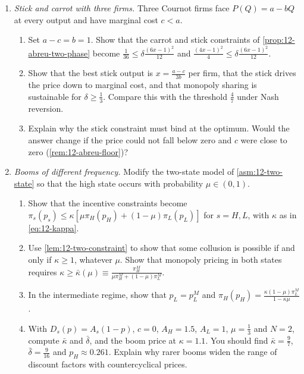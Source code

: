 \begin{enumerate}[label=\arabic*., leftmargin=*, itemsep=6pt]
\item \textit{Stick and carrot with three firms.} Three Cournot firms face $P(Q) = a - bQ$ at every output and have
marginal cost $c < a$.
\begin{enumerate}[label=(\alph*)]
  \item Set $a - c = b = 1$. Show that the carrot and stick constraints of \cref{prop:12-abreu-two-phase} become
  $\frac{1}{36} \le \delta\frac{(6x - 1)^2}{12}$ and $\frac{(4x - 1)^2}{4} \le \delta\frac{(6x - 1)^2}{12}$.
  \item Show that the best stick output is $x = \frac{a - c}{3b}$ per firm, that the stick drives the price down to
  marginal cost, and that monopoly sharing is sustainable for $\delta \ge \frac{1}{3}$. Compare this with the
  threshold $\frac{4}{7}$ under Nash reversion.
  \item Explain why the stick constraint must bind at the optimum. Would the answer change if the price could not
  fall below zero and $c$ were close to zero (\cref{rem:12-abreu-floor})?
\end{enumerate}

\item \textit{Booms of different frequency.} Modify the two-state model of \cref{asm:12-two-state} so that the high
state occurs with probability $\mu \in (0, 1)$.
\begin{enumerate}[label=(\alph*)]
  \item Show that the incentive constraints become $\pi_s(p_s) \le \kappa[\mu\pi_H(p_H) + (1 - \mu)\pi_L(p_L)]$ for
  $s = H, L$, with $\kappa$ as in \eqref{eq:12-kappa}.
  \item Use \cref{lem:12-two-constraint} to show that some collusion is possible if and only if $\kappa \ge 1$,
  whatever $\mu$. Show that monopoly pricing in both states requires
  $\kappa \ge \bar\kappa(\mu) \equiv \frac{\pi_H^M}{\mu\pi_H^M + (1 - \mu)\pi_L^M}$.
  \item In the intermediate regime, show that $p_L = p_L^M$ and
  $\pi_H(p_H) = \frac{\kappa(1 - \mu)\pi_L^M}{1 - \kappa\mu}$.
  \item With $D_s(p) = A_s(1 - p)$, $c = 0$, $A_H = 1.5$, $A_L = 1$, $\mu = \frac{1}{3}$ and $N = 2$, compute
  $\bar\kappa$ and $\bar\delta$, and the boom price at $\kappa = 1.1$. You should find $\bar\kappa = \frac{9}{7}$,
  $\bar\delta = \frac{9}{16}$ and $p_H \approx 0.261$. Explain why rarer booms widen the range of discount factors
  with countercyclical prices.
\end{enumerate}


\end{enumerate}
